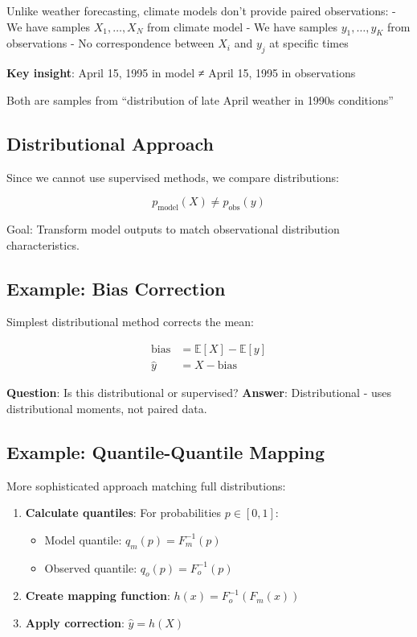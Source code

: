 \documentclass[
  letterpaper,
  DIV=11,
  numbers=noendperiod]{scrreprt}
\providecommand{\tightlist}{%
  \setlength{\itemsep}{0pt}\setlength{\parskip}{0pt}}
\begin{document}
Unlike weather forecasting, climate models don't provide paired
observations: - We have samples \({X_1, \ldots, X_N}\) from climate
model - We have samples \({y_1, \ldots, y_K}\) from observations - No
correspondence between \(X_i\) and \(y_j\) at specific times

\textbf{Key insight}: April 15, 1995 in model ≠ April 15, 1995 in
observations

Both are samples from ``distribution of late April weather in 1990s
conditions''

\subsection{Distributional Approach}\label{distributional-approach}

Since we cannot use supervised methods, we compare distributions:

\[p_{\text{model}}(X) \neq p_{\text{obs}}(y)\]

Goal: Transform model outputs to match observational distribution
characteristics.

\subsection{Example: Bias Correction}\label{example-bias-correction}

Simplest distributional method corrects the mean:

\[\begin{aligned}
\text{bias} &= \mathbb{E}[X] - \mathbb{E}[y] \\
\hat{y} &= X - \text{bias}
\end{aligned}\]

\textbf{Question}: Is this distributional or supervised?
\textbf{Answer}: Distributional - uses distributional moments, not
paired data.

\subsection{Example: Quantile-Quantile
Mapping}\label{example-quantile-quantile-mapping}

More sophisticated approach matching full distributions:

\begin{enumerate}
\def\labelenumi{\arabic{enumi}.}
\item
  \textbf{Calculate quantiles}: For probabilities \(p \in [0,1]\):

  \begin{itemize}
  \tightlist
  \item
    Model quantile: \(q_m(p) = F_m^{-1}(p)\)
  \item
    Observed quantile: \(q_o(p) = F_o^{-1}(p)\)
  \end{itemize}
\item
  \textbf{Create mapping function}: \(h(x) = F_o^{-1}(F_m(x))\)
\item
  \textbf{Apply correction}: \(\hat{y} = h(X)\)
\end{enumerate}
\end{document}
